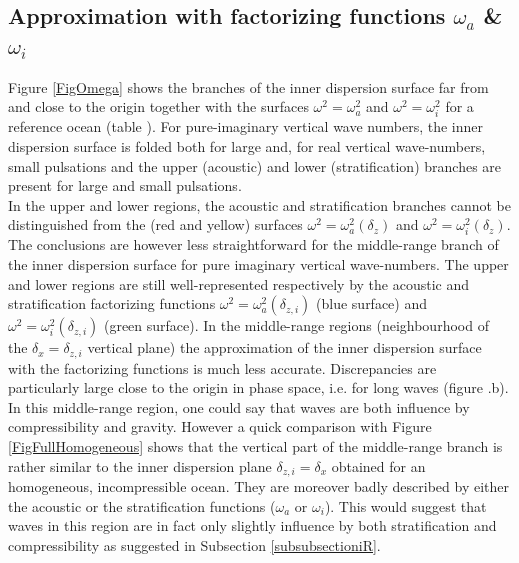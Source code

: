 \documentclass[a4paper,11pt]{article}
\begin{document}

\subsection{Approximation with factorizing functions $\omega_a$ \& $\omega_i$}
Figure \ref{FigOmega} shows the branches of the inner dispersion surface far from and close to the origin together with the surfaces $\omega^2=\omega_a^2$ and $\omega^2=\omega_i^2$ for a reference ocean (table ). For pure-imaginary vertical wave numbers, the inner dispersion surface is folded both for large and, for real vertical wave-numbers, small pulsations and the upper (acoustic) and lower (stratification) branches are present for large and small pulsations.\\
In the upper and lower regions, the acoustic and stratification branches cannot be distinguished from the (red and yellow) surfaces $\omega^2=\omega_a^2(\delta_z)$ and $\omega^2=\omega_i^2(\delta_z)$. The conclusions are however less straightforward for the middle-range branch of the inner dispersion surface for pure imaginary vertical wave-numbers. The upper and lower regions are still well-represented respectively by the acoustic and stratification factorizing functions $\omega^2=\omega_a^2(\delta_{z,i})$ (blue surface) and $\omega^2=\omega_i^2(\delta_{z,i})$ (green surface). In the middle-range regions (neighbourhood of the $\delta_x=\delta_{z,i}$ vertical plane) the approximation of the inner dispersion surface with the factorizing functions is much less accurate. Discrepancies are particularly large close to the origin in phase space, i.e. for long waves (figure .b). In this middle-range  region, one could say that waves are both influence by compressibility and gravity. However a quick comparison with Figure \ref{FigFullHomogeneous} shows that the vertical part of the middle-range branch is rather similar to the inner dispersion plane $\delta_{z,i}=\delta_x$ obtained for an homogeneous, incompressible ocean. They are moreover badly described by either the acoustic or the stratification functions ($\omega_a$ or $\omega_i$). This would suggest that waves in this region are in fact only slightly influence by both stratification and compressibility as suggested in Subsection \ref{subsubsectioniR}.\\
\end{document}
